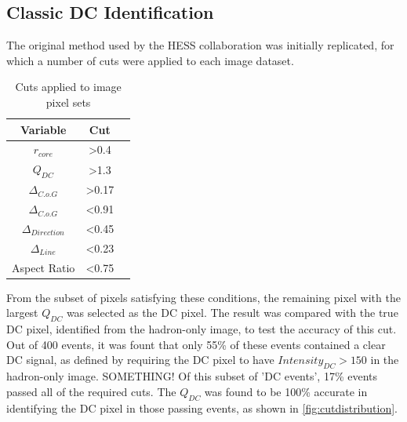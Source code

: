 \documentclass{article}
\begin{document}
\subsection{Classic DC Identification}
The original method used by the HESS collaboration \cite{hess07} was initially replicated, for which a number of cuts were applied to each image dataset.

\begin{table}[h!]
  \centering
  \caption{Cuts applied to image pixel sets}
  \label{tab:table1}
  \begin{tabular}{ccc}
    \toprule
    Variable & Cut\\
    \midrule
     $r_{core}$ & \textgreater 0.4 \\
     $Q_{DC}$ & \textgreater 1.3 \\
     $ \Delta_{C.o.G}$ & \textgreater 0.17 \\
     $ \Delta_{C.o.G}$ & \textless 0.91 \\
     $\Delta_{Direction}$ & \textless 0.45 \\
     $\Delta_{Line}$ & \textless 0.23 \\
     Aspect Ratio & \textless 0.75 \\
    \bottomrule
  \end{tabular}
\end{table}

From the subset of pixels satisfying these conditions, the remaining pixel with the largest $Q_{DC}$ was selected as the DC pixel. The result was compared with the true DC pixel, identified from the hadron-only image, to test the accuracy of this cut. Out of 400 events, it was fount that only 55\% of these events contained a clear DC signal, as defined by requiring the DC pixel to have $Intensity_{DC} > 150$ in the hadron-only image. SOMETHING! Of this subset of 'DC events', 17\% events passed all of the required cuts. The $Q_{DC}$ was found to be 100\% accurate in identifying the DC pixel in those passing events, as shown in \ref{fig:cutdistribution}.
\end{document}
